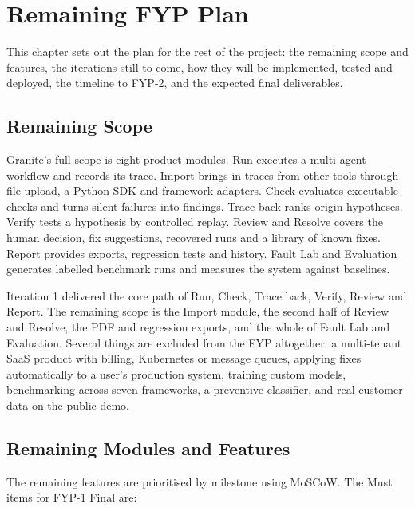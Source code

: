 \chapter{Remaining FYP Plan}

This chapter sets out the plan for the rest of the project: the remaining scope and features, the iterations still to come, how they will be implemented, tested and deployed, the timeline to FYP-2, and the expected final deliverables.

\section{Remaining Scope}

Granite's full scope is eight product modules. Run executes a multi-agent workflow and records its trace. Import brings in traces from other tools through file upload, a Python SDK and framework adapters. Check evaluates executable checks and turns silent failures into findings. Trace back ranks origin hypotheses. Verify tests a hypothesis by controlled replay. Review and Resolve covers the human decision, fix suggestions, recovered runs and a library of known fixes. Report provides exports, regression tests and history. Fault Lab and Evaluation generates labelled benchmark runs and measures the system against baselines.

Iteration 1 delivered the core path of Run, Check, Trace back, Verify, Review and Report. The remaining scope is the Import module, the second half of Review and Resolve, the PDF and regression exports, and the whole of Fault Lab and Evaluation. Several things are excluded from the FYP altogether: a multi-tenant SaaS product with billing, Kubernetes or message queues, applying fixes automatically to a user's production system, training custom models, benchmarking across seven frameworks, a preventive classifier, and real customer data on the public demo.

\section{Remaining Modules and Features}

The remaining features are prioritised by milestone using MoSCoW. The Must items for FYP-1 Final are:

